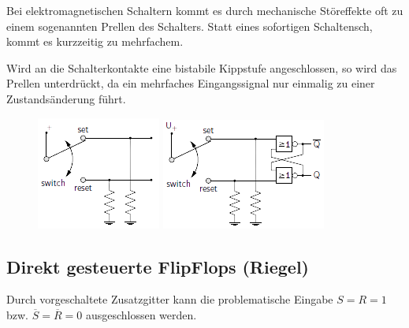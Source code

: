 \documentclass[12pt]{report}
\begin{document}
\begin{exbox}
  Bei elektromagnetischen Schaltern kommt es durch mechanische Störeffekte oft zu einem sogenannten Prellen des Schalters.
  Statt eines sofortigen Schaltensch, kommt es kurzzeitig zu mehrfachem.

  \par Wird an die Schalterkontakte eine bistabile Kippstufe angeschlossen, so wird das Prellen unterdrückt,
  da ein mehrfaches Eingangssignal nur einmalig zu einer Zustandsänderung führt.
  \begin{figure}[H]
    \begin{minipage}[t]{0.45\textwidth}
      \centering
      \includegraphics{riegel_prellender_schalter}
    \end{minipage}
    \hfill
    \begin{minipage}[t]{0.45\textwidth}
      \centering
      \includegraphics{riegel_prellfreier_schalter}
    \end{minipage}
  \end{figure}
\end{exbox}

\subsection{Direkt gesteuerte FlipFlops (Riegel)}
Durch vorgeschaltete Zusatzgitter kann die problematische Eingabe $S=R=1$ bzw. $\overline{S} = \overline{R}=0$ ausgeschlossen werden.
\end{document}
